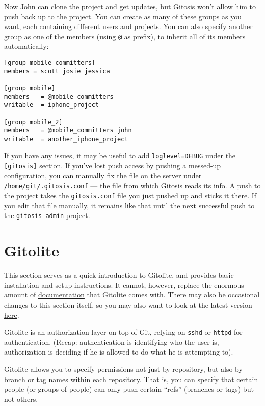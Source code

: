 \documentclass[a4paper]{book}
\newcounter{tab}[chapter]
\begin{document}
Now John can clone the project and get updates, but Gitosis won't allow him to push back up to the project. You can create as many of these groups as you want, each containing different users and projects. You can also specify another group as one of the members (using \texttt{@} as prefix), to inherit all of its members automatically:

\begin{shaded}\begin{verbatim}
[group mobile_committers]
members = scott josie jessica

[group mobile]
members   = @mobile_committers
writable  = iphone_project

[group mobile_2]
members   = @mobile_committers john
writable  = another_iphone_project
\end{verbatim}\end{shaded}

If you have any issues, it may be useful to add \texttt{loglevel=DEBUG} under the \texttt{{[}gitosis{]}} section. If you've lost push access by pushing a messed-up configuration, you can manually fix the file on the server under \texttt{/home/git/.gitosis.conf} --- the file from which Gitosis reads its info. A push to the project takes the \texttt{gitosis.conf} file you just pushed up and sticks it there. If you edit that file manually, it remains like that until the next successful push to the \texttt{gitosis-admin} project.

\section{Gitolite}\label{gitolite}

This section serves as a quick introduction to Gitolite, and provides basic installation and setup instructions. It cannot, however, replace the enormous amount of \href{http://sitaramc.github.com/gitolite/master-toc.html}{documentation} that Gitolite comes with. There may also be occasional changes to this section itself, so you may also want to look at the latest version \href{http://sitaramc.github.com/gitolite/progit.html}{here}.

Gitolite is an authorization layer on top of Git, relying on \texttt{sshd} or \texttt{httpd} for authentication. (Recap: authentication is identifying who the user is, authorization is deciding if he is allowed to do what he is attempting to).

Gitolite allows you to specify permissions not just by repository, but also by branch or tag names within each repository. That is, you can specify that certain people (or groups of people) can only push certain “refs” (branches or tags) but not others.
\end{document}
